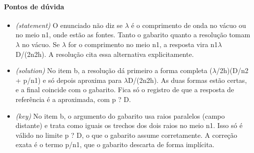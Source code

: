 \documentclass{article}%
\begin{document}
\paragraph{Pontos de dúvida}%
\begin{itemize}%
\item%
\textit{(statement)} O enunciado não diz se $\lambda$ é o comprimento de onda no vácuo ou no meio n1, onde estão as fontes. Tanto o gabarito quanto a resolução tomam $\lambda$ no vácuo. Se $\lambda$ for o comprimento no meio n1, a resposta vira n1$\lambda$D/(2n2h). A resolução cita essa alternativa explicitamente.%
\item%
\textit{(solution)} No item b, a resolução dá primeiro a forma completa ($\lambda$/2h)(D/n2 + p/n1) e só depois aproxima para $\lambda$D/(2n2h). As duas formas estão certas, e a final coincide com o gabarito. Fica só o registro de que a resposta de referência é a aproximada, com p ? D.%
\item%
\textit{(key)} No item b, o argumento do gabarito usa raios paralelos (campo distante) e trata como iguais os trechos dos dois raios no meio n1. Isso só é válido no limite p ? D, o que o gabarito assume corretamente. A correção exata é o termo p/n1, que o gabarito descarta de forma implícita.%
\end{itemize}%
\end{document}
